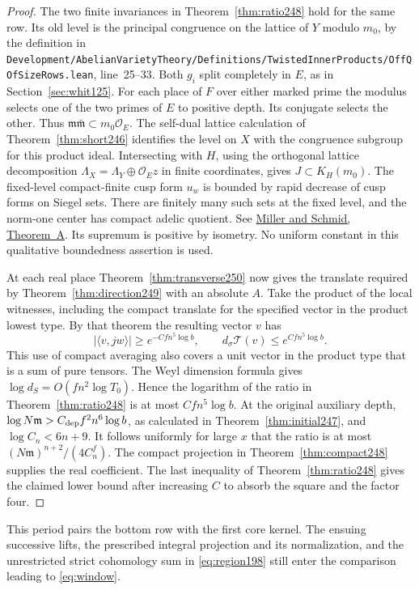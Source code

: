 \documentclass[a4paper,11pt]{article}
\theoremstyle{definition}
\theoremstyle{remark}
\newcommand{\srcloc}[2]{{\small\nolinkurl{#1.lean}}, line~#2}
\numberwithin{equation}{section}
\begin{document}
\begin{proof}
The two finite invariances in Theorem~\ref{thm:ratio248} hold for the
same row. Its old level is the principal congruence on the lattice of
\(Y\) modulo \(m_0\), by the definition in
\srcloc{Development/AbelianVarietyTheory/Definitions/TwistedInnerProducts/OffQOfSizeRows}{25--33}.
Both \(g_i\) split completely in \(E\), as in Section~\ref{sec:whit125}.
For each place of \(F\) over either marked prime the modulus selects one
of the two primes of \(E\) to positive depth. Its conjugate selects the
other. Thus \(\mathfrak m\bar{\mathfrak m}\subset m_0\mathcal O_E\).
The self-dual lattice calculation of Theorem~\ref{thm:short246} identifies
the level on \(X\) with the congruence subgroup for this product ideal.
Intersecting with \(H\), using the orthogonal lattice decomposition
\(\Lambda_X=\Lambda_Y\oplus\mathcal O_E z\) in finite coordinates,
gives \(J\subset K_H(m_0)\). The fixed-level compact-finite cusp form
\(u_w\) is bounded by rapid decrease of cusp forms on Siegel sets. There
are finitely many such sets at the fixed level, and the norm-one center
has compact adelic quotient. See \href{https://arxiv.org/abs/1106.2149}{Miller
and Schmid, Theorem~A}. Its supremum is positive by isometry. No
uniform constant in this qualitative boundedness assertion is used.

At each real place Theorem~\ref{thm:transverse250} now gives the
translate required by Theorem~\ref{thm:direction249} with an absolute
\(A\). Take the product of the local witnesses, including the compact
translate for the specified vector in the product lowest type. By
that theorem the resulting vector \(v\) has
\[
 |\langle v,jw\rangle|\ge e^{-C f n^5\log b},\qquad
 d_\sigma\mathcal T(v)\le e^{C f n^5\log b} .
\]
This use of compact averaging also covers a unit vector in the product
type that is a sum of pure tensors. The Weyl dimension formula gives
\(\log d_S=O(f n^2\log T_0)\). Hence the logarithm of the ratio in
Theorem~\ref{thm:ratio248} is at most \(C f n^5\log b\). At the
original auxiliary depth, \(\log N\mathfrak m>C_{\rm dep} f^2 n^6\log b\),
as calculated in Theorem~\ref{thm:initial247}, and
\(\log C_n<6n+9\). It follows uniformly for large \(x\) that the ratio
is at most \((N\mathfrak m)^{n+2}/(4 C_n^f)\). The compact projection in
Theorem~\ref{thm:compact248} supplies the real coefficient. The last
inequality of Theorem~\ref{thm:ratio248} gives the claimed lower bound
after increasing \(C\) to absorb the square and the factor four.
\end{proof}

This period pairs the bottom row with the first core kernel. The ensuing
successive lifts, the prescribed integral projection and its normalization,
and the unrestricted strict cohomology sum in \eqref{eq:region198} still
enter the comparison leading to \eqref{eq:window}.
\end{document}
